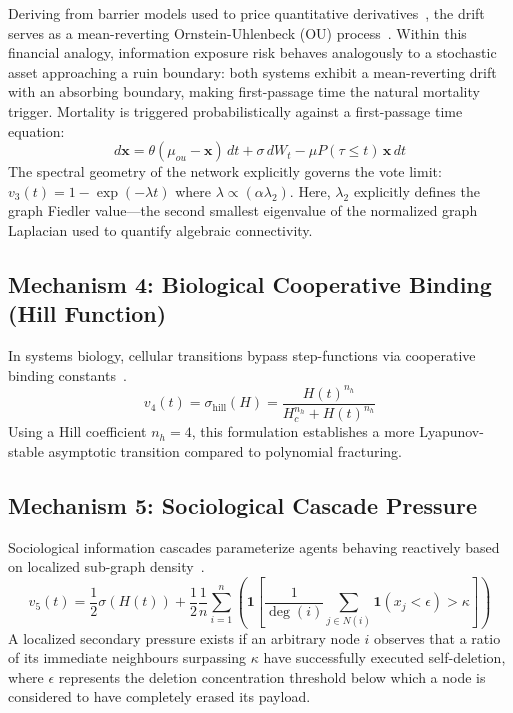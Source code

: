 \documentclass[conference]{IEEEtran}
\newcommand{\ind}{\mathbf{1}}
\begin{document}
Deriving from barrier models used to price quantitative
derivatives~\cite{black1973pricing}, the drift serves as a mean-reverting
Ornstein-Uhlenbeck (OU) process~\cite{uhlenbeck1930theory}. Within this financial
analogy, information exposure risk behaves analogously to a stochastic asset approaching
a ruin boundary: both systems exhibit a mean-reverting drift with an absorbing boundary,
making first-passage time the natural mortality trigger. Mortality is triggered
probabilistically against a first-passage time equation:
\begin{equation}
  d\mathbf{x} = \theta(\mu_{ou} - \mathbf{x})\,dt + \sigma\,dW_t
               - \mu P(\tau \leq t)\,\mathbf{x}\,dt
  \label{eq:finance}
\end{equation}
The spectral geometry of the network explicitly governs the vote limit:
$v_3(t) = 1 - \exp(-\lambda t)$ where $\lambda \propto (\alpha\lambda_2)$. Here,
$\lambda_2$ explicitly defines the graph Fiedler value---the second smallest eigenvalue
of the normalized graph Laplacian used to quantify algebraic connectivity.

\subsection{Mechanism 4: Biological Cooperative Binding (Hill Function)}

In systems biology, cellular transitions bypass step-functions via cooperative binding
constants~\cite{alon2019systems}.
\begin{equation}
  v_4(t) = \sigma_{\mathrm{hill}}(H) = \frac{H(t)^{n_h}}{H_c^{n_h} + H(t)^{n_h}}
  \label{eq:hill}
\end{equation}
Using a Hill coefficient $n_h = 4$, this formulation establishes a more
Lyapunov-stable asymptotic transition compared to polynomial fracturing.

\subsection{Mechanism 5: Sociological Cascade Pressure}

Sociological information cascades parameterize agents behaving reactively based on
localized sub-graph density~\cite{watts2002simple}.
\begin{equation}
  v_5(t) = \frac{1}{2}\sigma(H(t)) + \frac{1}{2}\frac{1}{n}\sum_{i=1}^{n}
  \!\left(\ind\!\!\left[\frac{1}{\deg(i)}
  \sum_{j \in N(i)}\!\ind(x_j < \epsilon) > \kappa\right]\!\right)
  \label{eq:social}
\end{equation}
A localized secondary pressure exists if an arbitrary node $i$ observes that a ratio of
its immediate neighbours surpassing $\kappa$ have successfully executed self-deletion,
where $\epsilon$ represents the deletion concentration threshold below which a node is
considered to have completely erased its payload.
\end{document}
